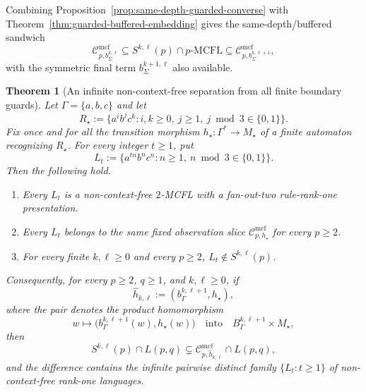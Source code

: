 \documentclass[11pt,a4paper]{article}
\numberwithin{equation}{section}
\theoremstyle{plain}
\newtheorem{theorem}{Theorem}[section]
\theoremstyle{definition}
\theoremstyle{remark}
\newcommand{\Cmcf}[2]{\mathcal{C}^{\mathrm{mcf}}_{#1,#2}}
\begin{document}
Combining Proposition~\ref{prop:same-depth-guarded-converse} with
Theorem~\ref{thm:guarded-buffered-embedding} gives the same-depth/buffered
sandwich
\[
  \Cmcf{p}{b_\Sigma^{k,\ell}}
  \subseteq
  S^{k,\ell}(p)\cap p\text{-}\mathrm{MCFL}
  \subseteq
  \Cmcf{p}{b_\Sigma^{k,\ell+1}},
\]
with the symmetric final term $b_\Sigma^{k+1,\ell}$ also available.


\begin{theorem}[An infinite non-context-free separation from all finite boundary guards]
\label{thm:guarded-infinite-noncfl-separation}
Let \(\Gamma=\{a,b,c\}\) and let
\[
 R_\star:=\{a^i b^j c^k:i,k\ge0,\ j\ge1,\ j\bmod3\in\{0,1\}\}.
\]
Fix once and for all the transition morphism
\(h_\star:\Gamma^*\to M_\star\) of a finite automaton recognizing
\(R_\star\).  For every integer \(t\ge1\), put
\[
  L_t:=\{a^{tn}b^nc^n:n\ge1,\ n\bmod3\in\{0,1\}\}.
\]
Then the following hold.
\begin{enumerate}[label=(\roman*),leftmargin=*]
\item Every \(L_t\) is a non-context-free \(2\)-MCFL with a fan-out-two
rule-rank-one presentation.
\item Every \(L_t\) belongs to the same fixed observation slice
\(\Cmcf{p}{h_\star}\) for every \(p\ge2\).
\item For every finite \(k,\ell\ge0\) and every \(p\ge2\),
\(L_t\notin S^{k,\ell}(p)\).
\end{enumerate}
Consequently, for every \(p\ge2\), \(q\ge1\), and \(k,\ell\ge0\), if
\[
 \widehat h_{k,\ell}:=(b_\Gamma^{k,\ell+1},h_\star),
\]
where the pair denotes the product homomorphism
\[
  w\longmapsto\bigl(b_\Gamma^{k,\ell+1}(w),h_\star(w)\bigr)
  \quad\text{into}\quad B_\Gamma^{k,\ell+1}\times M_\star,
\]
then
\[
 S^{k,\ell}(p)\cap L(p,q)
 \subsetneq
 \Cmcf{p}{\widehat h_{k,\ell}}\cap L(p,q),
\]
and the difference contains the infinite pairwise distinct family
\(\{L_t:t\ge1\}\) of non-context-free rank-one languages.
\end{theorem}
\end{document}
